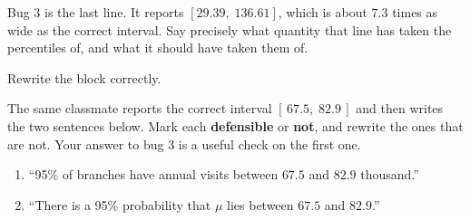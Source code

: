 \documentclass[11pt]{article}
\newcommand{\answerspace}[1]{\vspace{#1}}
\begin{document}
\begin{questions}
\begin{parts}
\item Bug 3 is the last line. It reports $[29.39,\; 136.61]$, which is about $7.3$ times as wide as
the correct interval. Say precisely what quantity that line has taken the percentiles of, and what
it should have taken them of.
\answerspace{4.5em}

\item Rewrite the block correctly.
\answerspace{4em}

\item The same classmate reports the correct interval $[\,67.5,\; 82.9\,]$ and then writes the two
sentences below. Mark each \textbf{defensible} or \textbf{not}, and rewrite the ones that are not.
Your answer to bug 3 is a useful check on the first one.
\begin{enumerate}[label=\textbf{S\arabic*.}, leftmargin=2.2em, itemsep=.25em, topsep=.35em]
\item ``95\% of branches have annual visits between $67.5$ and $82.9$ thousand.''
\item ``There is a 95\% probability that $\mu$ lies between $67.5$ and $82.9$.''
\end{enumerate}
\answerspace{5em}
\end{parts}

\end{questions}
\end{document}
